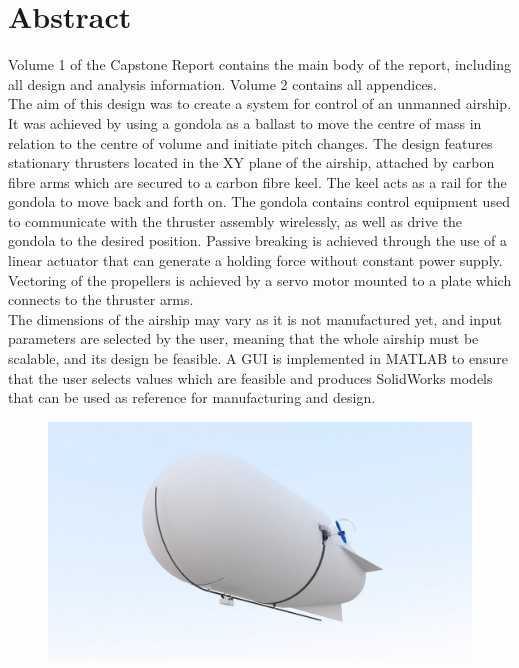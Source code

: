 \documentclass[]{book}
\begin{document}
\frontmatter

\chapter*{Abstract}
Volume 1 of the Capstone Report contains the main body of the report, including all design and analysis information. Volume 2 contains all appendices.\\

The aim of this design was to create a system for control of an unmanned airship. It was achieved by using a gondola as a ballast to move the centre of mass in relation to the centre of volume and initiate pitch changes. The design features stationary thrusters located in the XY plane of the airship, attached by carbon fibre arms which are secured to a carbon fibre keel. The keel acts as a rail for the gondola to move back and forth on. The gondola contains control equipment used to communicate with the thruster assembly wirelessly, as well as drive the gondola to the desired position. Passive breaking is achieved through the use of a linear actuator that can generate a holding force without constant power supply. Vectoring of the propellers is achieved by a servo motor mounted to a plate which connects to the thruster arms.\\

The dimensions of the airship may vary as it is not manufactured yet, and input parameters are selected by the user, meaning that the whole airship must be scalable, and its design be feasible. A GUI is implemented in MATLAB to ensure that the user selects values which are feasible and produces SolidWorks models that can be used as reference for manufacturing and design.\\

\begin{figure}[H]
	\centering
	\includegraphics[width=.85\linewidth]{img/general/fullPerspective.JPG}
\end{figure}
\end{document}
